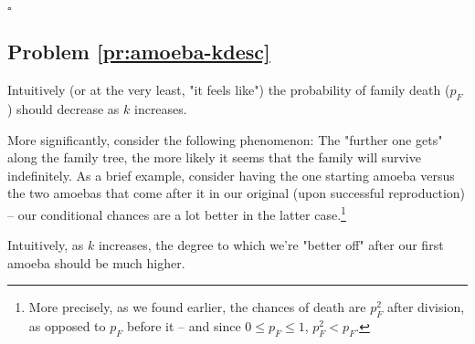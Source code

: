 $\square$





\subsection{Problem \ref{pr:amoeba-kdesc}}

Intuitively (or at the very least, "it feels like") the probability of family death ($p_F$) should decrease as $k$ increases.

More significantly, consider the following phenomenon: The "further one gets" along the family tree, the more likely it seems that the family will survive indefinitely. As a brief example, consider having the one starting amoeba versus the two amoebas that come after it in our original (upon successful reproduction) -- our conditional chances are a lot better in the latter case.\footnote{More precisely, as we found earlier, the chances of death are $p_F^2$ after division, as opposed to $p_F$ before it -- and since $0 \leq p_F \leq 1$, $p_F^2 < p_F$.}

Intuitively, as $k$ increases, the degree to which we're "better off" after our first amoeba should be much higher. 


